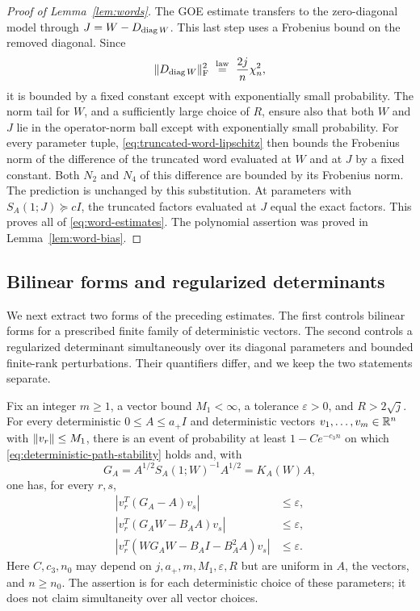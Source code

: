 \begin{proof}[Proof of Lemma~\ref{lem:words}]
The GOE estimate transfers to the zero-diagonal model through
$J=W-D_{\operatorname{diag} W}$.  This last step uses a Frobenius bound on the
removed diagonal.  Since
\[
 \lVert D_{\operatorname{diag} W}\rVert_{\mathrm F}^{2}
   \ \stackrel{\mathrm{law}}=\ \frac{2j}{n}\chi_n^2,
\]
it is bounded by a fixed constant except with exponentially
small probability.  The norm tail for $W$, and a sufficiently
large choice of $R$, ensure also that both $W$ and $J$ lie in the
operator-norm ball except with exponentially small probability.
For every parameter tuple, \eqref{eq:truncated-word-lipschitz}
then bounds the Frobenius norm of the difference of the truncated
word evaluated at $W$ and at $J$ by a fixed constant.  Both
$N_2$ and $N_4$ of this difference are bounded by its Frobenius
norm.  The prediction is unchanged by this substitution.  At
parameters with $S_A(1;J)\succeq cI$, the truncated factors
evaluated at $J$ equal the exact factors.  This proves all of
\eqref{eq:word-estimates}.  The polynomial assertion was proved
in Lemma~\ref{lem:word-bias}.
\end{proof}

\subsection{Bilinear forms and regularized determinants}

We next extract two forms of the preceding estimates.  The first
controls bilinear forms for a prescribed finite family of
deterministic vectors.  The second controls a regularized
determinant simultaneously over its diagonal parameters and
bounded finite-rank perturbations.  Their quantifiers differ,
and we keep the two statements separate.

\begin{lemma}\label{lem:bilinear}
Fix an integer $m\ge1$, a vector bound $M_1<\infty$, a tolerance
$\varepsilon>0$, and $R>2\sqrt j$.  For every deterministic
$0\le A\le a_+I$ and deterministic vectors
$v_1,\ldots,v_m\in\mathbb R^n$ with $\lVert v_r\rVert\le M_1$, there is an
event of probability at least $1-Ce^{-c_3n}$ on which
\eqref{eq:deterministic-path-stability} holds and, with
\[
 G_A=A^{1/2}S_A(1;W)^{-1}A^{1/2}=K_A(W)A,
\]
one has, for every $r,s$,
\begin{align}
 |v_r^T(G_A-A)v_s|&\le\varepsilon,
 \label{eq:bilinear-G}\\
 |v_r^T(G_AW-B_AA)v_s|&\le\varepsilon,
 \label{eq:bilinear-GW}\\
 |v_r^T(WG_AW-B_AI-B_A^2A)v_s|&\le\varepsilon.
 \label{eq:bilinear-WGW}
\end{align}
Here $C,c_3,n_0$ may depend on $j,a_+,m,M_1,\varepsilon,R$ but
are uniform in $A$, the vectors, and $n\ge n_0$.  The assertion
is for each deterministic choice of these parameters; it does
not claim simultaneity over all vector choices.
\end{lemma}

